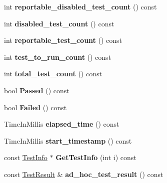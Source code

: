 \begin{DoxyCompactItemize}
int {\bfseries reportable\+\_\+disabled\+\_\+test\+\_\+count} () const
\item 
\mbox{\label{classtesting_1_1TestSuite_adba738351633471e3256dcf7d3c2e61e}} 
int {\bfseries disabled\+\_\+test\+\_\+count} () const
\item 
\mbox{\label{classtesting_1_1TestSuite_a24f62e17cfd37b90263f1194fb7d4d74}} 
int {\bfseries reportable\+\_\+test\+\_\+count} () const
\item 
\mbox{\label{classtesting_1_1TestSuite_a1ccf2681712a3a27659789009815db8f}} 
int {\bfseries test\+\_\+to\+\_\+run\+\_\+count} () const
\item 
\mbox{\label{classtesting_1_1TestSuite_a38a5e95341cfee5a88d8910f69da4960}} 
int {\bfseries total\+\_\+test\+\_\+count} () const
\item 
\mbox{\label{classtesting_1_1TestSuite_add51ece89b069b29e07f0476e0e6aae9}} 
bool {\bfseries Passed} () const
\item 
\mbox{\label{classtesting_1_1TestSuite_adec55446c23dc2d0bfea91c6125a1047}} 
bool {\bfseries Failed} () const
\item 
\mbox{\label{classtesting_1_1TestSuite_a2ede69fa37985ab8b21128955c56d6d7}} 
Time\+In\+Millis {\bfseries elapsed\+\_\+time} () const
\item 
\mbox{\label{classtesting_1_1TestSuite_ac0cbbbe96addf56964380b2bbc013e41}} 
Time\+In\+Millis {\bfseries start\+\_\+timestamp} () const
\item 
\mbox{\label{classtesting_1_1TestSuite_a604220b75b3c6252287ba62d1d1754a9}} 
const \mbox{\hyperlink{classtesting_1_1TestInfo}{Test\+Info}} $\ast$ {\bfseries Get\+Test\+Info} (int i) const
\item 
\mbox{\label{classtesting_1_1TestSuite_a3391a0ec111c66e1ac16a800f5068af7}} 
const \mbox{\hyperlink{classtesting_1_1TestResult}{Test\+Result}} \& {\bfseries ad\+\_\+hoc\+\_\+test\+\_\+result} () const
\end{DoxyCompactItemize}

